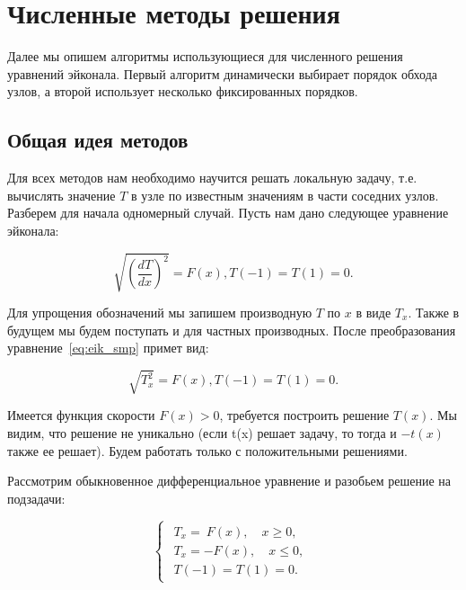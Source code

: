 \section{Численные методы решения}
\label{sec:algrhtms}

Далее мы опишем алгоритмы использующиеся для численного решения
уравнений эйконала. Первый алгоритм динамически выбирает порядок
обхода узлов, а второй использует несколько фиксированных порядков.



\subsection{Общая идея методов}
\label{sec:general-idea}

Для всех методов нам необходимо научится решать локальную задачу,
т.е. вычислять значение $T$ в узле по известным значениям в части
соседних узлов. Разберем для начала одномерный случай. Пусть нам дано
следующее уравнение эйконала:

\begin{equation}
  \label{eq:eik_smp}
  \sqrt{(\frac{dT}{dx})^2}=F(x), T(-1) = T(1) = 0.
\end{equation}


Для упрощения обозначений мы запишем производную $T$ по $x$ в виде
$T_x$. Также в будущем мы будем поступать и для частных
производных. После преобразования уравнение~\eqref{eq:eik_smp} примет вид:

\begin{equation*}
  \sqrt{T_x^2}=F(x), T(-1) = T(1) = 0.
\end{equation*}


Имеется функция скорости $F(x) > 0$, требуется построить
решение $T(x)$. Мы видим, что решение не уникально (если t(x) решает
задачу, то тогда и $-t(x)$ также ее решает). Будем работать только с
положительными решениями.

Рассмотрим обыкновенное дифференциальное уравнение и разобьем решение
на подзадачи:

\begin{equation*}
  \begin{cases}
      \begin{array}{ll}
        T_x = ~F(x), \quad x \ge 0,\\
        T_x = -F(x), \quad x \le 0,\\[0.3cm]
        T(-1)= T(1) = 0.
      \end{array}
    \end{cases}
\end{equation*}

